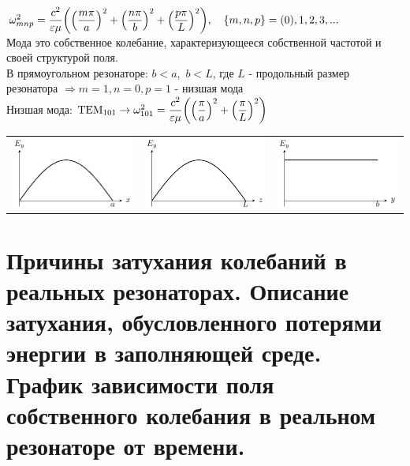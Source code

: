 \begin{multicols*}{2}
		$\omega_{mnp}^2=\dfrac{c^2}{\varepsilon\mu}\qty(\qty(\dfrac{m\pi}{a})^2+\qty(\dfrac{n\pi}{b})^2+\qty(\dfrac{p\pi}{L})^2),\quad \{m,n,p\} = (0),1,2,3,...$ \\
		Мода это собственное колебание, характеризующееся собственной частотой и своей структурой поля.\\
		В прямоугольном резонаторе: $b < a$,~$b < L$, где $L$ - продольный размер резонатора $\Rightarrow m = 1, n = 0, p = 1$ - низшая мода\\
		Низшая мода: ${\text{TEM}}_{101} \rightarrow \omega_{101}^2 = \dfrac{c^2}{\varepsilon\mu}\qty(\qty(\dfrac{\pi}{a})^2+\qty(\dfrac{\pi}{L})^2)$ \\
		\begin{tabular}{l l l}
			\includegraphics[width=0.25\linewidth]{aed_imgs/ask11_1} &
			\includegraphics[width=0.25\linewidth]{aed_imgs/ask11_2} &
			\includegraphics[width=0.25\linewidth]{aed_imgs/ask11_3} \\
		\end{tabular}
		
		\section{Причины затухания колебаний в реальных резонаторах. Описание затухания, обусловленного потерями энергии в заполняющей среде. График зависимости поля собственного колебания в реальном резонаторе от времени.}
		

\end{multicols*}
